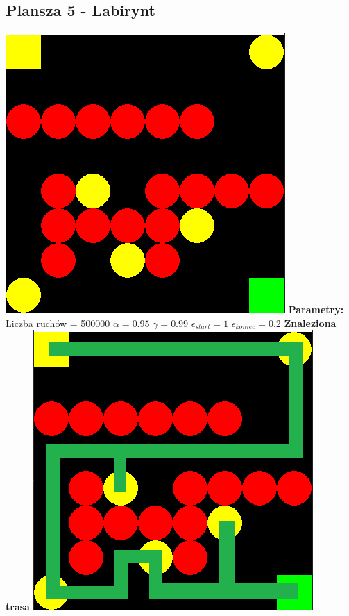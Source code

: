 \documentclass[a4paper,12pt]{article}
\begin{document}
\subsection{Plansza 5 - Labirynt}
\includegraphics[scale=0.73]{testy/plansza5.png} \newline
\textbf{Parametry:}
Liczba ruchów = 500000
\newline \(\alpha = 0.95\)
\newline \(\gamma = 0.99\)
\newline \(\epsilon_{start} = 1\)
\newline \(\epsilon_{koniec} = 0.2\) \newline \newline
\textbf{\Large{Znaleziona trasa}} \newline \newline
\includegraphics[scale=0.73]{testy/plansza5trasa.png} \newline \newline
\end{document}
